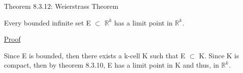 { \color{red} Theorem 8.3.12: Weierstrass Theorem } 

	\begin{adjustbox}{minipage=14cm, right, vspace=0.1cm 0cm}
		Every bounded infinite set E $\subset$ $\mathbb{R}^k$ has
		a limit point in $\mathbb{R}^k$.
	\end{adjustbox}

{ \color{magenta} \underline{Proof} } 

	Since E is bounded, then there exists a k-cell K such that
	E $\subset$ K.
	Since K is compact, then by {\color{red} theorem 8.3.10},
	E has a limit point in K and thus, in $\mathbb{R}^k$.





